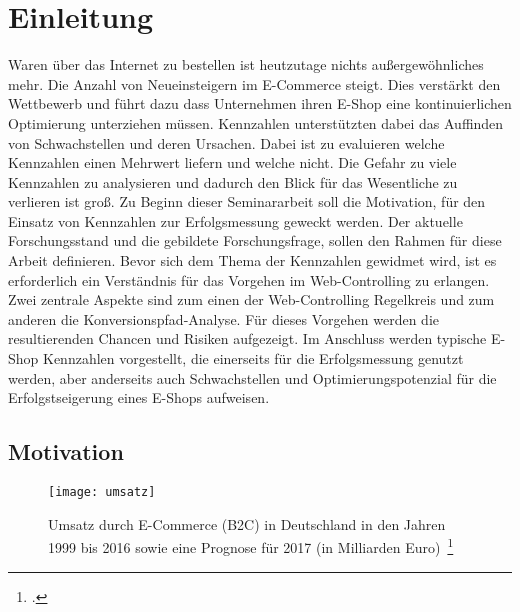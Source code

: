 \section{Einleitung}
Waren über das Internet zu bestellen ist heutzutage nichts außergewöhnliches mehr. Die Anzahl von Neueinsteigern im E-Commerce steigt. Dies verstärkt den Wettbewerb und führt dazu dass Unternehmen ihren E-Shop eine kontinuierlichen Optimierung unterziehen müssen. Kennzahlen unterstützten dabei das Auffinden von Schwachstellen und deren Ursachen. Dabei ist zu evaluieren welche Kennzahlen einen Mehrwert liefern und welche nicht. Die Gefahr zu viele Kennzahlen zu analysieren und dadurch den Blick für das Wesentliche zu verlieren ist groß.
Zu Beginn dieser Seminararbeit soll die Motivation, für den Einsatz von Kennzahlen zur Erfolgsmessung geweckt werden. Der aktuelle Forschungsstand und die gebildete Forschungsfrage, sollen den Rahmen für diese Arbeit definieren. Bevor sich dem Thema der Kennzahlen gewidmet wird, ist es erforderlich ein Verständnis für das Vorgehen im Web-Controlling zu erlangen. Zwei zentrale Aspekte sind zum einen der Web-Controlling Regelkreis und zum anderen die Konversionspfad-Analyse. Für dieses Vorgehen werden die resultierenden Chancen und Risiken aufgezeigt. Im Anschluss werden typische E-Shop Kennzahlen vorgestellt, die einerseits für die Erfolgsmessung genutzt werden, aber anderseits auch Schwachstellen und Optimierungspotenzial für die Erfolgstseigerung eines E-Shops aufweisen.

\subsection{Motivation}

\begin{figure}[H]
	\begin{center}
		\texttt{[image: umsatz]}
		\caption{Umsatz durch E-Commerce (B2C) in Deutschland in den Jahren 1999 bis 2016 sowie eine Prognose für 2017 (in Milliarden Euro)~\footcite[Vgl. ][]{website:statista:umsatz}}
	\end{center}
\end{figure}

